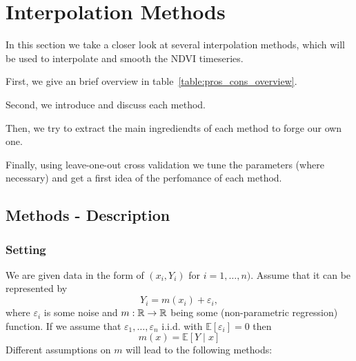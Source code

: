 \chapter{Interpolation Methods}



In this section we take a closer look at several interpolation methods, which will be used to interpolate and smooth the NDVI timeseries.

First, we give an brief overview in table~\ref{table:pros_cons_overview}.

Second, we introduce and discuss each method.

Then, we try to extract the main ingrediendts of each method to forge our own one.

Finally, using leave-one-out cross validation we tune the parameters (where necessary) and get a first idea of the perfomance of each method.


\footnotesize

\normalsize


\section{Methods - Description}
\subsection*{Setting}
We are given data in the form of $\left(x_{i}, Y_{i}\right)$ for $i=1, \ldots, n)$. Assume that it can be represented by
$$
  Y_{i}=m\left(x_{i}\right)+\varepsilon_{i},
$$
where $\varepsilon_i$ is some noise and $m: \mathbb{R} \rightarrow \mathbb{R}$ being some (non-parametric regression) function. If we assume that $\varepsilon_{1}, \ldots, \varepsilon_{n}$ i.i.d. with $\mathbb{E}\left[\varepsilon_{i}\right]=0$ then $$m(x)=\mathbb{E}[Y \mid x]$$
Different assumptions on $m$ will lead to the following methods:

